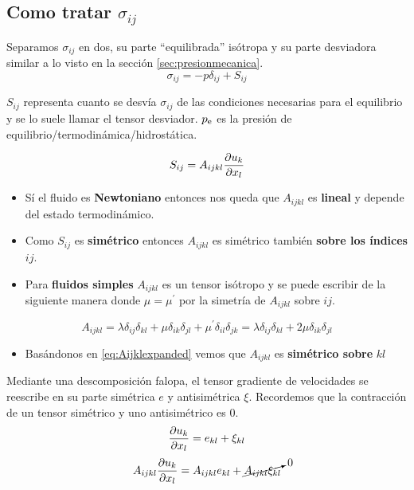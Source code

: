 \subsection[Como reescribir los esfuerzos]{Como tratar $\sigma_{ij}$}
Separamos $\sigma_{ij}$ en dos, su parte ``equilibrada'' isótropa y su parte desviadora similar a lo visto en la sección \ref{sec:presionmecanica}. 
\begin{equation}\label{eq:sigma1}
\sigma_{ij}=-p \delta_{ij} +S_{ij}
\end{equation}


$S_{ij}$ representa cuanto se desvía $\sigma_{ij}$ de las condiciones necesarias para el equilibrio y se lo suele llamar el tensor desviador. $\pe$ es la presión de equilibrio/termodinámica/hidrostática.

\[S_{ij}=A_{ijkl}\frac{\partial u_k}{\partial x_l} \]

\begin{itemize}
\item Sí el fluido es \textbf{Newtoniano} entonces nos queda que $A_{ijkl}$ es \textbf{lineal} y depende del estado termodinámico.

\item Como $S_{ij}$ es \textbf{simétrico} entonces $A_{ijkl}$ es simétrico también \textbf{sobre los índices }$ij$. 

\item Para \textbf{fluidos simples} $A_{ijkl}$ es un tensor isótropo y se puede escribir de la siguiente manera donde $\mu=\mu^\prime$ por la simetría de $A_{ijkl}$ sobre $ij$.
\end{itemize}
\begin{equation} \label{eq:Aijklexpanded}
    A_{ijkl}=\lambda\delta_{ij}\delta_{kl} +\mu\delta_{ik}\delta_{jl}+\mu^\prime \delta_{il}\delta_{jk}=\lambda\delta_{ij}\delta_{kl} +2\mu\delta_{ik}\delta_{jl}
\end{equation}

\begin{itemize}
\item Basándonos en \ref{eq:Aijklexpanded} vemos que $A_{ijkl}$ es \textbf{simétrico sobre} $kl$
\end{itemize}
Mediante una descomposición falopa, el tensor gradiente de velocidades se reescribe en su parte simétrica $e$ y antisimétrica $\xi$. Recordemos que la contracción de un tensor simétrico y uno antisimétrico es $0$.
$$\frac{\partial u_k}{\partial x_l}=e_{kl}+\xi_{kl}$$
$$A_{ijkl}\frac{\partial u_k}{\partial x_l}=A_{ijkl}e_{kl}+\cancelto{0}{A_{ijkl}\xi_{kl}} $$

